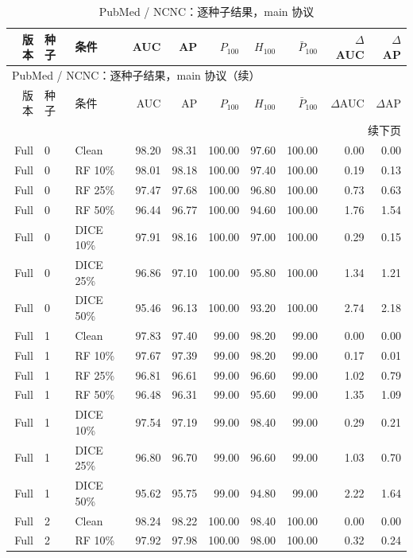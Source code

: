 {\footnotesize
\setlength{\tabcolsep}{3.2pt}
\renewcommand{\arraystretch}{1.10}
\begin{longtable}{rllrrrrrrr}
\caption{PubMed / NCNC：逐种子结果，main 协议}\\
\toprule
版本 & 种子 & 条件 & AUC & AP & $P_{100}$ & $H_{100}$ & $\bar P_{100}$ & $\Delta$AUC & $\Delta$AP \\
\midrule
\endfirsthead
\multicolumn{10}{l}{PubMed / NCNC：逐种子结果，main 协议（续）}\\
\toprule
版本 & 种子 & 条件 & AUC & AP & $P_{100}$ & $H_{100}$ & $\bar P_{100}$ & $\Delta$AUC & $\Delta$AP \\
\midrule
\endhead
\midrule\multicolumn{10}{r}{续下页}\\
\endfoot
\bottomrule
\endlastfoot
Full & 0 & Clean & 98.20 & 98.31 & 100.00 & 97.60 & 100.00 & 0.00 & 0.00 \\
Full & 0 & RF 10\% & 98.01 & 98.18 & 100.00 & 97.40 & 100.00 & 0.19 & 0.13 \\
Full & 0 & RF 25\% & 97.47 & 97.68 & 100.00 & 96.80 & 100.00 & 0.73 & 0.63 \\
Full & 0 & RF 50\% & 96.44 & 96.77 & 100.00 & 94.60 & 100.00 & 1.76 & 1.54 \\
Full & 0 & DICE 10\% & 97.91 & 98.16 & 100.00 & 97.00 & 100.00 & 0.29 & 0.15 \\
Full & 0 & DICE 25\% & 96.86 & 97.10 & 100.00 & 95.80 & 100.00 & 1.34 & 1.21 \\
Full & 0 & DICE 50\% & 95.46 & 96.13 & 100.00 & 93.20 & 100.00 & 2.74 & 2.18 \\
Full & 1 & Clean & 97.83 & 97.40 & 99.00 & 98.20 & 99.00 & 0.00 & 0.00 \\
Full & 1 & RF 10\% & 97.67 & 97.39 & 99.00 & 98.20 & 99.00 & 0.17 & 0.01 \\
Full & 1 & RF 25\% & 96.81 & 96.61 & 99.00 & 96.60 & 99.00 & 1.02 & 0.79 \\
Full & 1 & RF 50\% & 96.48 & 96.31 & 99.00 & 95.60 & 99.00 & 1.35 & 1.09 \\
Full & 1 & DICE 10\% & 97.54 & 97.19 & 99.00 & 98.40 & 99.00 & 0.29 & 0.21 \\
Full & 1 & DICE 25\% & 96.80 & 96.70 & 99.00 & 96.60 & 99.00 & 1.03 & 0.70 \\
Full & 1 & DICE 50\% & 95.62 & 95.75 & 99.00 & 94.80 & 99.00 & 2.22 & 1.64 \\
Full & 2 & Clean & 98.24 & 98.22 & 100.00 & 98.40 & 100.00 & 0.00 & 0.00 \\
Full & 2 & RF 10\% & 97.92 & 97.98 & 100.00 & 98.00 & 100.00 & 0.32 & 0.24 \\

\end{longtable}}
